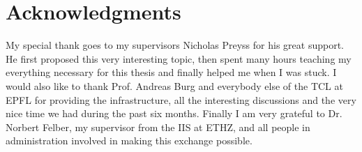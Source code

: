 \chapter*{Acknowledgments}
My special thank goes to my supervisors Nicholas Preyss for his great support.
He first proposed this very interesting topic, then spent many hours
teaching my everything necessary for this thesis and finally helped me when I was
stuck.
I would also like to thank Prof. Andreas Burg and everybody else of the
\gls{TCL} at \gls{EPFL} for providing the infrastructure, all the interesting
discussions and the very nice time we had during the past six months.
Finally I am very grateful to Dr. Norbert Felber, my supervisor from the
\gls{IIS} at \gls{ETHZ}, and all people in administration involved in making
this exchange possible. \\

